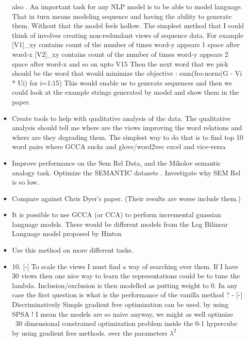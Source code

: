 \documentclass[11pt]{article}
\begin{document}
\begin{itemize}
also \cite{zweig2011MSRSCC,zweig2012msrchallenge}.
An important task for any NLP model is to be able to model
    language. That in turn means modeling sequence and having the
    ability to generate them. Without that the model feels hollow. The
    simplest method that I could think of involves creating
    non-redundant views of sequence data.
   For example 
   [V1]\_xy contains count of the number of times word-y appears 1 space after word-x
   [V2]\_xy contains count of the number of times word-y appears 2 space after word-x
   and so on upto V15
   Then the next word that we pick should be the word that would
    minimize the objective : sum(fro-norm(G - Vi * Ui) for i=1:15) 
   This would enable us to generate sequences and then we could look at
    the example strings generated by model and show them in the paper.
\item Create tools to help with qualitative analysis of the data. The
    qualitative analysis should tell me where are the views improving
    the word relations and where are they degrading them. The simplest
    way to do that is to find top 10 word pairs where GCCA sucks and
    glove/word2vec excel and vice-versa 
  \item Improve performance on the Sem Rel Data, and the Mikolov
    semantic analogy task. Optimize the SEMANTIC datasets .  Investigate why SEM Rel is so low. 
  \item Compare against Chris Dyer's paper. (Their results are worse
    include them.)
  \item It is possible to use GCCA  (or CCA) to perform incremental guassian
    language models. These would be different models from the Log
    Bilinear Language model proposed by Hinton
  \item Use this method on more different tasks. 
  \item 10. [-] To scale the views I must find a way of searching over them.
    If I have 30 views then one nice way to learn the representations could
    be to tune the lambda. Inclusion/exclusion is then modelled as
    putting weight to 0. In any case the first question is what is the
    performance of the vanilla method ? 
    - [-] Discriminatively
      Simple gradient free optimization can be used. by using SPSA !
      I mean the models are so naive anyway, we might as well optimize
      ~30 dimensional constrained optimization problem inside the 0-1
      hypercube by using gradient free methods. over the parameters $\lambda^2$
\end{itemize}
\end{document}
